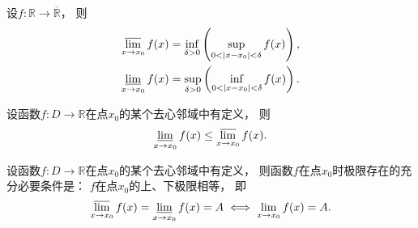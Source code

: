 \begin{theorem}
设\(f\colon \mathbb{R} \to \overline{\mathbb{R}}\)，
则\begin{gather*}
	\varlimsup_{x \to x_0} f(x)
	= \inf_{\delta > 0} \left( \sup_{0<\abs{x-x_0}<\delta} f(x) \right), \\
	\varliminf_{x \to x_0} f(x)
	= \sup_{\delta > 0} \left( \inf_{0<\abs{x-x_0}<\delta} f(x) \right).
\end{gather*}
\end{theorem}

\begin{property}
设函数\(f\colon D\to\mathbb{R}\)在点\(x_0\)的某个去心邻域中有定义，
则\begin{equation*}
	\varliminf_{x \to x_0} f(x) \leq \varlimsup_{x \to x_0} f(x).
\end{equation*}
\end{property}

\begin{theorem}
设函数\(f\colon D\to\mathbb{R}\)在点\(x_0\)的某个去心邻域中有定义，
则函数\(f\)在点\(x_0\)时极限存在的充分必要条件是：
\(f\)在点\(x_0\)的上、下极限相等，
即\begin{equation*}
	\varlimsup_{x \to x_0} f(x)
	= \varliminf_{x \to x_0} f(x)
	= A
	\iff
	\lim_{x \to x_0} f(x) = A.
\end{equation*}
\end{theorem}
